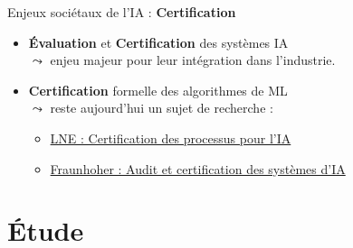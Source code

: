 \documentclass[11pt,serif,mathserif,compress,hyperref={colorlinks}]{beamer}
\begin{document}
\begin{frame}{Enjeux sociétaux de l'IA : {\bf Certification}}
  
  \begin{tcolorbox}[title={\bf Certification}]
    \begin{itemize}
    \item {\bf Évaluation} et {\bf Certification} des systèmes IA\\
      $\leadsto$ enjeu majeur pour leur intégration dans l'industrie. \medskip
    \item {\bf Certification} formelle des algorithmes de ML\\
      $\leadsto$ reste aujourd'hui un sujet de recherche :
      \begin{itemize}
      \item \href{https://www.lne.fr/fr/service/certification/certification-processus-ia}{LNE : Certification des processus pour l'IA}
      \item \href{https://www.hhi.fraunhofer.de/en/departments/ai/technologies-and-solutions/auditing-and-certification-of-ai-systems.html}
           {Fraunhoher : Audit et certification des systèmes d'IA}
      \end{itemize}
    \end{itemize}
  \end{tcolorbox}
    
\end{frame}

\section{Étude}

\begin{frame}{}

  \vfill
  \vfill

\end{frame}
\end{document}
